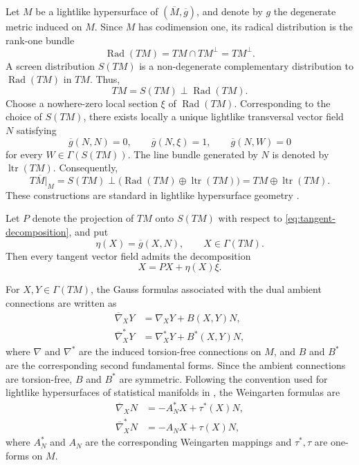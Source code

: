 \documentclass[10pt,a4paper]{amsart}
\newcommand{\Rad}{\operatorname{Rad}}
\newcommand{\ltr}{\operatorname{ltr}}
\begin{document}
Let $M$ be a lightlike hypersurface of
$(\overline{M},\overline{g})$, and denote by $g$ the degenerate metric
induced on $M$. Since $M$ has codimension one, its radical distribution
is the rank-one bundle
\begin{equation}\label{eq:radical}
\Rad(TM)=TM\cap TM^{\perp}=TM^{\perp}.
\end{equation}
A screen distribution $S(TM)$ is a non-degenerate complementary
distribution to $\Rad(TM)$ in $TM$. Thus,
\begin{equation}\label{eq:tangent-decomposition}
TM=S(TM)\mathbin{\perp}\Rad(TM).
\end{equation}
Choose a nowhere-zero local section $\xi$ of $\Rad(TM)$. Corresponding
to the choice of $S(TM)$, there exists locally a unique lightlike
transversal vector field $N$ satisfying
\begin{equation}\label{eq:null-frame}
\overline{g}(N,N)=0,\qquad
\overline{g}(N,\xi)=1,\qquad
\overline{g}(N,W)=0
\end{equation}
for every $W\in\Gamma(S(TM))$. The line bundle generated by $N$ is
denoted by $\ltr(TM)$. Consequently,
\begin{equation}\label{eq:ambient-decomposition}
T\overline{M}|_{M}
=
S(TM)\mathbin{\perp}
\bigl(\Rad(TM)\oplus\ltr(TM)\bigr)
=
TM\oplus\ltr(TM).
\end{equation}
These constructions are standard in lightlike hypersurface geometry
\cite{DuggalBejancu1996,DuggalJin2007,DuggalSahin2010}.

Let $P$ denote the projection of $TM$ onto $S(TM)$ with respect to
\eqref{eq:tangent-decomposition}, and put
\begin{equation}\label{eq:eta}
\eta(X)=\overline{g}(X,N),\qquad X\in\Gamma(TM).
\end{equation}
Then every tangent vector field admits the decomposition
\begin{equation}\label{eq:projection}
X=PX+\eta(X)\xi.
\end{equation}

For $X,Y\in\Gamma(TM)$, the Gauss formulas associated with the dual
ambient connections are written as
\begin{align}
\overline{\nabla}_{X}Y
&=
\nabla_{X}Y+B(X,Y)N,
\label{eq:gauss}\\
\overline{\nabla}^{*}_{X}Y
&=
\nabla^{*}_{X}Y+B^{*}(X,Y)N,
\label{eq:gauss-star}
\end{align}
where $\nabla$ and $\nabla^{*}$ are the induced torsion-free
connections on $M$, and $B$ and $B^{*}$ are the corresponding second
fundamental forms. Since the ambient connections are torsion-free,
$B$ and $B^{*}$ are symmetric. Following the convention used for lightlike hypersurfaces of statistical
manifolds in \cite{BahadirTripathi2023}, the Weingarten formulas are
\begin{align}
\overline{\nabla}_{X}N
&=
-A^{*}_{N}X+\tau^{*}(X)N,
\label{eq:weingarten}\\
\overline{\nabla}^{*}_{X}N
&=
-A_{N}X+\tau(X)N,
\label{eq:weingarten-star}
\end{align}
where $A^{*}_{N}$ and $A_{N}$ are the corresponding Weingarten mappings
and $\tau^{*},\tau$ are one-forms on $M$.
\end{document}
